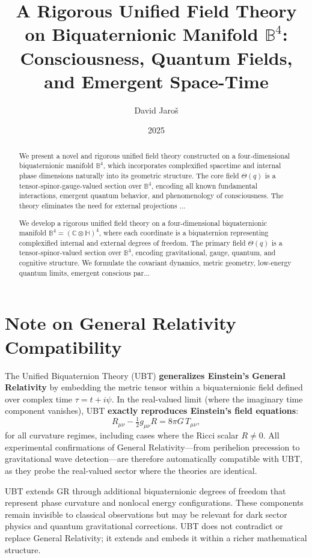 \documentclass[12pt]{article}
\title{A Rigorous Unified Field Theory on Biquaternionic Manifold \( \mathbb{B}^4 \): Consciousness, Quantum Fields, and Emergent Space-Time}
\author{David Jaroš}
\date{2025}
\begin{document}
\maketitle

\begin{abstract}
We present a novel and rigorous unified field theory constructed on a four-dimensional biquaternionic manifold \( \mathbb{B}^4 \), which incorporates complexified spacetime and internal phase dimensions naturally into its geometric structure. The core field \( \Theta(q) \) is a tensor-spinor-gauge-valued section over \( \mathbb{B}^4 \), encoding all known fundamental interactions, emergent quantum behavior, and phenomenology of consciousness. The theory eliminates the need for external projections ...

We develop a rigorous unified field theory on a four-dimensional biquaternionic manifold \( \mathbb{B}^4 = (\mathbb{C} \otimes \mathbb{H})^4 \), where each coordinate is a biquaternion representing complexified internal and external degrees of freedom. The primary field \( \Theta(q) \) is a tensor-spinor-valued section over \( \mathbb{B}^4 \), encoding gravitational, gauge, quantum, and cognitive structure. We formulate the covariant dynamics, metric geometry, low-energy quantum limits, emergent conscious par...
\end{abstract}

\section*{Note on General Relativity Compatibility}

The Unified Biquaternion Theory (UBT) \textbf{generalizes Einstein's General Relativity} by embedding the metric tensor within a biquaternionic field defined over complex time $\tau = t + i\psi$. In the real-valued limit (where the imaginary time component vanishes), UBT \textbf{exactly reproduces Einstein's field equations}:
\[
R_{\mu\nu} - \tfrac{1}{2} g_{\mu\nu} R = 8\pi G \, T_{\mu\nu},
\]
for all curvature regimes, including cases where the Ricci scalar $R \neq 0$. All experimental confirmations of General Relativity—from perihelion precession to gravitational wave detection—are therefore automatically compatible with UBT, as they probe the real-valued sector where the theories are identical.

UBT extends GR through additional biquaternionic degrees of freedom that represent phase curvature and nonlocal energy configurations. These components remain invisible to classical observations but may be relevant for dark sector physics and quantum gravitational corrections. UBT does not contradict or replace General Relativity; it extends and embeds it within a richer mathematical structure.
\end{document}
